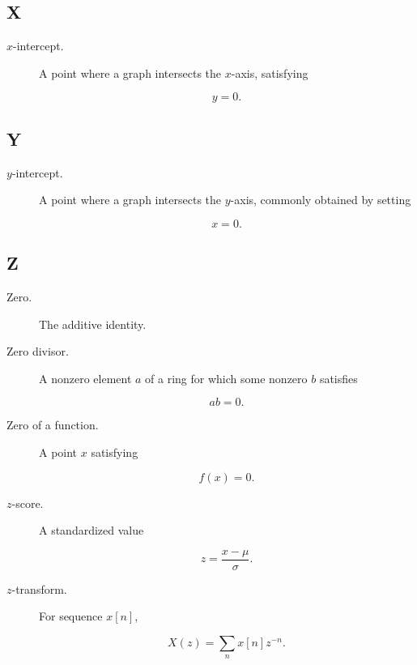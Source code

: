 \subsection*{X}

\begin{description}

\item[\(x\)-intercept.]
A point where a graph intersects the \(x\)-axis, satisfying

\[
y=0.
\]

\end{description}

\subsection*{Y}

\begin{description}

\item[\(y\)-intercept.]
A point where a graph intersects the \(y\)-axis, commonly obtained by setting

\[
x=0.
\]

\end{description}

\subsection*{Z}

\begin{description}

\item[Zero.]
The additive identity.

\item[Zero divisor.]
A nonzero element \(a\) of a ring for which some nonzero \(b\) satisfies

\[
ab=0.
\]

\item[Zero of a function.]
A point \(x\) satisfying

\[
f(x)=0.
\]

\item[\(z\)-score.]
A standardized value

\[
z
=
\frac{
x-\mu
}{
\sigma
}.
\]

\item[\(z\)-transform.]
For sequence \(x[n]\),

\[
X(z)
=
\sum_n
x[n]z^{-n}.
\]

\end{description}

